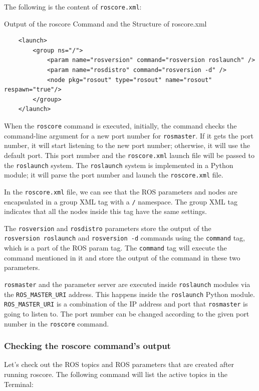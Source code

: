 \documentclass[../../main]{subfiles}
\begin{document}
The following is the content of \texttt{roscore.xml}:
\begin{codebox}[]{Output of the roscore Command and the Structure of roscore.xml}
    
    \begin{verbatim}
    <launch>
        <group ns="/">
            <param name="rosversion" command="rosversion roslaunch" />
            <param name="rosdistro" command="rosversion -d" />
            <node pkg="rosout" type="rosout" name="rosout" respawn="true"/>
        </group>
    </launch>
\end{verbatim}
    \end{codebox}

When the \texttt{roscore} command is executed, initially, the command checks the command-line argument for a new port number for \texttt{rosmaster}. If it gets the port number, it will start listening to the new port number; otherwise, it will use the default port. This port number and the \texttt{roscore.xml} launch file will be passed to the \texttt{roslaunch} system. The \texttt{roslaunch} system is implemented in a Python module; it will parse the port number and launch the \texttt{roscore.xml} file.

In the \texttt{roscore.xml} file, we can see that the ROS parameters and nodes are encapsulated in a group XML tag with a \texttt{/} namespace. The group XML tag indicates that all the nodes inside this tag have the same settings.


The \texttt{rosversion} and \texttt{rosdistro} parameters store the output of the \\ \texttt{rosversion roslaunch} and \texttt{rosversion -d} commands using the \texttt{command} tag, which is a part of the ROS param tag. The \texttt{command} tag will execute the command mentioned in it and store the output of the command in these two parameters.

\texttt{rosmaster} and the parameter server are executed inside \texttt{roslaunch} modules via the \texttt{ROS\_MASTER\_URI} address. This happens inside the \texttt{roslaunch} Python module.\\ \texttt{ROS\_MASTER\_URI} is a combination of the IP address and port that \texttt{rosmaster} is going to listen to. The port number can be changed according to the given port number in the \texttt{roscore} command.

\subsubsection{Checking the roscore command's output}
Let's check out the ROS topics and ROS parameters that are created after running roscore. The following command will list the active topics in the Terminal:
\end{document}
